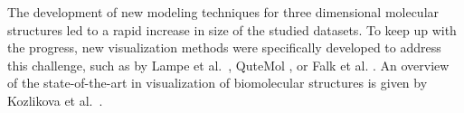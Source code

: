 \documentclass{egpubl}
\begin{document}
	
		
	
	The development of new modeling techniques for three dimensional molecular structures led to a rapid increase in size of the studied datasets.
	To keep up with the progress, new visualization methods were specifically developed to address this challenge, such as by Lampe et al.~\cite{lampe2007two}, QuteMol \cite{tarini2006ambient}, or Falk et al. \cite{falk2013atomistic}. 
	An overview of the state-of-the-art in visualization of biomolecular structures is given by Kozlikova et al.~\cite{kozlikova2015visualization}. 
	
\end{document}
